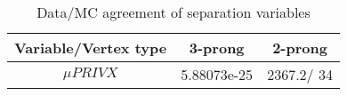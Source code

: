 \documentclass{article}
\begin{document}
\begin{table}[htbp]
\caption{\label{tab:sepVars}Data/MC agreement of separation variables}
\begin{center}
\begin{tabular}{c|c|c}
Variable/Vertex type & 3-prong & 2-prong\\
\hline
$\mu PRIVX$ & 5.88073e-25 & 2367.2/ 34\\
\hline
\end{tabular}
\end{center}
\end{table}
\end{document}
